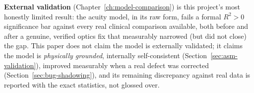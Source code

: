 \textbf{External validation} (Chapter~\ref{ch:model-comparison}) is this project's most
honestly limited result: the acuity model, in its raw form, fails a formal $R^2>0$
significance bar against every real clinical comparison available, both before and
after a genuine, verified optics fix that measurably narrowed (but did not close) the
gap. This paper does not claim the model is externally validated; it claims the model
is \emph{physically grounded}, internally self-consistent (Section~\ref{sec:asm-validation}),
improved measurably when a real defect was corrected (Section~\ref{sec:bug-shadowing}),
and its remaining discrepancy against real data is reported with the exact statistics,
not glossed over.
